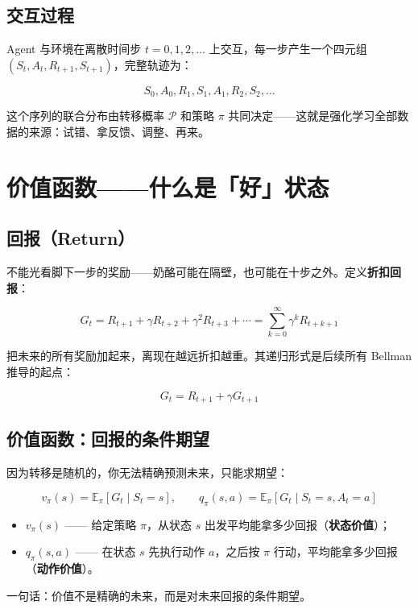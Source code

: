 \documentclass{article}
\begin{document}
\subsection*{交互过程}

Agent 与环境在离散时间步 $t=0,1,2,\ldots$ 上交互，每一步产生一个四元组 $(S_t, A_t, R_{t+1}, S_{t+1})$，完整轨迹为：

\[
S_0, A_0, R_1, S_1, A_1, R_2, S_2, \ldots
\]

这个序列的联合分布由转移概率 $\mathcal{P}$ 和策略 $\pi$ 共同决定——这就是强化学习全部数据的来源：试错、拿反馈、调整、再来。

\section*{价值函数——什么是「好」状态}

\subsection*{回报（Return）}

不能光看脚下一步的奖励——奶酪可能在隔壁，也可能在十步之外。定义\textbf{折扣回报}：

\[
\boxed{G_t = R_{t+1} + \gamma R_{t+2} + \gamma^2 R_{t+3} + \cdots = \sum_{k=0}^{\infty} \gamma^k R_{t+k+1}}
\]

把未来的所有奖励加起来，离现在越远折扣越重。其递归形式是后续所有 Bellman 推导的起点：

\[
\boxed{G_t = R_{t+1} + \gamma G_{t+1}}
\]

\subsection*{价值函数：回报的条件期望}

因为转移是随机的，你无法精确预测未来，只能求期望：

\[
\boxed{v_\pi(s) = \mathbb{E}_\pi[G_t \mid S_t = s]}, \qquad
\boxed{q_\pi(s,a) = \mathbb{E}_\pi[G_t \mid S_t = s, A_t = a]}
\]

\begin{itemize}
  \item $v_\pi(s)$ —— 给定策略 $\pi$，从状态 $s$ 出发平均能拿多少回报（\textbf{状态价值}）；
  \item $q_\pi(s,a)$ —— 在状态 $s$ 先执行动作 $a$，之后按 $\pi$ 行动，平均能拿多少回报（\textbf{动作价值}）。
\end{itemize}

一句话：价值不是精确的未来，而是对未来回报的条件期望。
\end{document}
